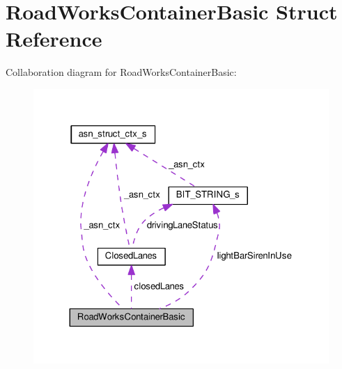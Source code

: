 \hypertarget{structRoadWorksContainerBasic}{}\section{Road\+Works\+Container\+Basic Struct Reference}
\label{structRoadWorksContainerBasic}


Collaboration diagram for Road\+Works\+Container\+Basic\+:\nopagebreak
\begin{figure}[H]
\begin{center}
\leavevmode
\includegraphics[width=324pt]{structRoadWorksContainerBasic__coll__graph}
\end{center}
\end{figure}
